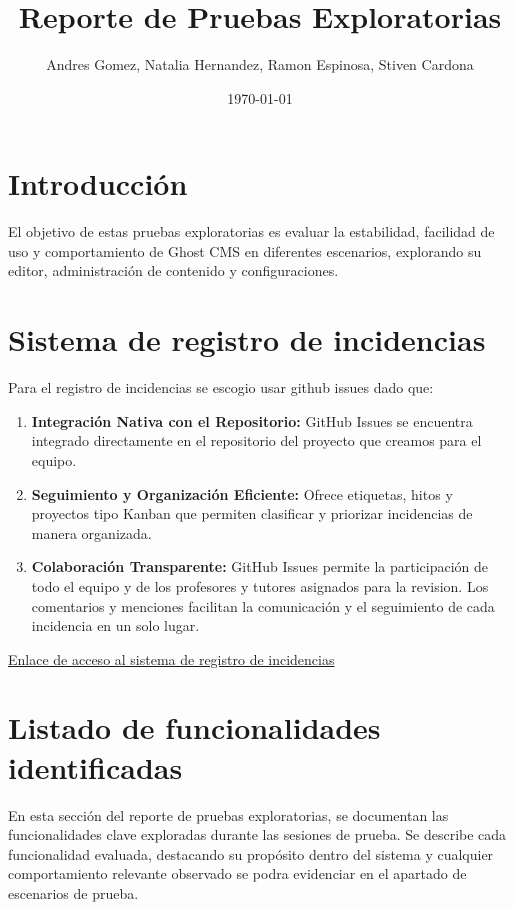 \documentclass[report,12pt]{article}
\title{\textbf{Reporte de Pruebas Exploratorias}}
\author{Andres Gomez, Natalia Hernandez, Ramon Espinosa, Stiven Cardona}
\date{\today}
\begin{document}
\maketitle

\section{Introducción}
El objetivo de estas pruebas exploratorias es evaluar la estabilidad, facilidad de uso y comportamiento de Ghost CMS en diferentes escenarios, explorando su editor, administración de contenido y configuraciones.

\section{Sistema de registro de incidencias}
Para el registro de incidencias se escogio usar github issues dado que:
\begin{enumerate}
    \item \textbf{Integración Nativa con el Repositorio:} GitHub Issues se encuentra integrado directamente en el repositorio del proyecto que creamos para el equipo.
    \item \textbf{Seguimiento y Organización Eficiente:} Ofrece etiquetas, hitos y proyectos tipo Kanban que permiten clasificar y priorizar incidencias de manera organizada.
    \item \textbf{Colaboración Transparente:} GitHub Issues permite la participación de todo el equipo y de los profesores y tutores asignados para la revision. Los comentarios y menciones facilitan la comunicación y el seguimiento de cada incidencia en un solo lugar.
\end{enumerate}

\href{https://github.com/stivencardonauniandes/pruebas-automatizadas/issues}{Enlace de acceso al sistema de registro de incidencias}

\section{Listado de funcionalidades identificadas}
En esta sección del reporte de pruebas exploratorias, se documentan las funcionalidades clave exploradas durante las sesiones de prueba. Se describe cada funcionalidad evaluada, destacando su propósito dentro del sistema y cualquier comportamiento relevante observado se podra evidenciar en el apartado de escenarios de prueba.
\end{document}
